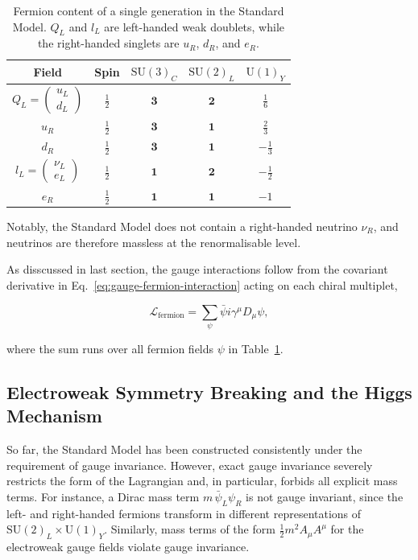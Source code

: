 \begin{table}[h!]
\centering
\begin{tabular}{c c c c c}
\hline
Field & Spin & $\mathrm{SU}(3)_C$ & $\mathrm{SU}(2)_L$ & $\mathrm{U}(1)_Y$ \\
\hline
$Q_L = \begin{pmatrix} u_L \\ d_L \end{pmatrix}$ & $\frac12$ & $\mathbf{3}$ & $\mathbf{2}$ & $\frac{1}{6}$ \\
$u_R$ & $\frac12$ & $\mathbf{3}$ & $\mathbf{1}$ & $\frac{2}{3}$ \\
$d_R$ & $\frac12$ & $\mathbf{3}$ & $\mathbf{1}$ & $-\frac{1}{3}$ \\
$l_L = \begin{pmatrix} \nu_L \\ e_L \end{pmatrix}$ & $\frac12$ & $\mathbf{1}$ & $\mathbf{2}$ & $-\frac{1}{2}$ \\
$e_R$ & $\frac12$ & $\mathbf{1}$ & $\mathbf{1}$ & $-1$ \\
\hline
\end{tabular}
\caption{Fermion content of a single generation in the Standard Model. 
$Q_L$ and $l_L$ are left-handed weak doublets, while the right-handed singlets are $u_R$, $d_R$, and $e_R$.}

\label{tab:fermions}
\end{table}

Notably, the Standard Model does not contain a right-handed neutrino $\nu_R$, and neutrinos are therefore massless at the renormalisable level.

As disscussed in last section, the gauge interactions follow from the covariant derivative in Eq.~\eqref{eq:gauge-fermion-interaction} acting on each chiral multiplet,

\begin{equation}
    \mathcal{L}_{\mathrm{fermion}}
    = \sum_{\psi} \bar{\psi} i \gamma^\mu D_\mu \psi,
\end{equation}\label{eq:SM-fermion}

where the sum runs over all fermion fields $\psi$ in Table~\ref{tab:fermions}.

\subsection{Electroweak Symmetry Breaking and the Higgs Mechanism}\label{subsec:Higgs}

So far, the Standard Model has been constructed consistently under the requirement of gauge invariance.
However, exact gauge invariance severely restricts the form of the Lagrangian and, in particular, forbids all explicit mass terms.
For instance, a Dirac mass term $m\,\bar{\psi}_L \psi_R$ is not gauge invariant, since the left- and right-handed fermions transform in different representations of $\mathrm{SU}(2)_L \times \mathrm{U}(1)_Y$.
Similarly, mass terms of the form $\tfrac12 m^2 A_\mu A^\mu$ for the electroweak gauge fields violate gauge invariance.

